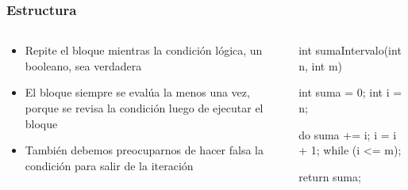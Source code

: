 \documentclass{beamer}
\begin{document}
\begin{frame}[fragile]
  \frametitle{Estructura }

  \begin{columns}
    \begin{column}{0.4\textwidth}
      \begin{itemize}
        
      \item Repite el bloque mientras la condición lógica, un
        booleano, sea verdadera
        
      \item El bloque siempre se evalúa la menos una vez, porque se
        revisa la condición luego de ejecutar el bloque
        
      \item También debemos preocuparnos de hacer falsa la condición
        para salir de la iteración

      \end{itemize}      
    \end{column}
    \begin{column}{0.6\textwidth}
\begin{jsmall}
        int sumaIntervalo(int n, int m) {
          int suma = 0;
          int i = n;

          do {
            suma += i;
            i = i + 1;
          } while (i <= m);          

          return suma;
        }
\end{jsmall}
    \end{column}
  \end{columns}
\end{frame}
\end{document}
